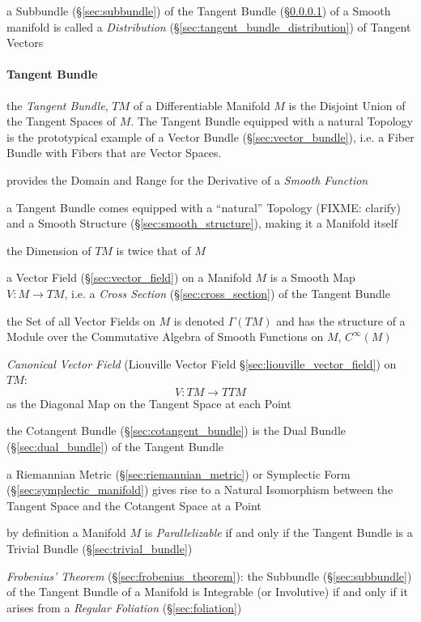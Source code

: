 a Subbundle (\S\ref{sec:subbundle}) of the Tangent Bundle
(\S\ref{sec:tangent_bundle}) of a Smooth manifold is called a
\emph{Distribution} (\S\ref{sec:tangent_bundle_distribution}) of Tangent
Vectors



\paragraph{Tangent Bundle}\label{sec:tangent_bundle}\hfill

the \emph{Tangent Bundle}, $T M$ of a Differentiable Manifold $M$ is the
Disjoint Union of the Tangent Spaces of $M$. The Tangent Bundle equipped with a
natural Topology is the prototypical example of a Vector Bundle
(\S\ref{sec:vector_bundle}), i.e. a Fiber Bundle with Fibers that are Vector
Spaces.

provides the Domain and Range for the Derivative of a \emph{Smooth Function}

a Tangent Bundle comes equipped with a ``natural'' Topology (FIXME: clarify)
and a Smooth Structure (\S\ref{sec:smooth_structure}), making it a Manifold
itself

the Dimension of $T M$ is twice that of $M$

a Vector Field (\S\ref{sec:vector_field}) on a Manifold $M$ is a Smooth Map $V
: M \rightarrow T M$, i.e. a \emph{Cross Section} (\S\ref{sec:cross_section})
of the Tangent Bundle

the Set of all Vector Fields on $M$ is denoted $\Gamma(TM)$ and has the
structure of a Module over the Commutative Algebra of Smooth Functions on $M$,
$C^\infty(M)$

\emph{Canonical Vector Field} (Liouville Vector Field
\S\ref{sec:liouville_vector_field}) on $TM$:
\[
  V : TM \rightarrow TTM
\]
as the Diagonal Map on the Tangent Space at each Point

the Cotangent Bundle (\S\ref{sec:cotangent_bundle}) is the Dual Bundle
(\S\ref{sec:dual_bundle}) of the Tangent Bundle

a Riemannian Metric (\S\ref{sec:riemannian_metric}) or Symplectic Form
(\S\ref{sec:symplectic_manifold}) gives rise to a Natural Isomorphism between
the Tangent Space and the Cotangent Space at a Point

by definition a Manifold $M$ is \emph{Parallelizable} if and only if the
Tangent Bundle is a Trivial Bundle (\S\ref{sec:trivial_bundle})

\emph{Frobenius' Theorem} (\S\ref{sec:frobenius_theorem}): the Subbundle
(\S\ref{sec:subbundle}) of the Tangent Bundle of a Manifold is Integrable (or
Involutive) if and only if it arises from a \emph{Regular Foliation}
(\S\ref{sec:foliation})

